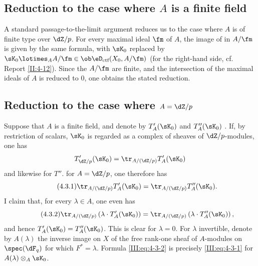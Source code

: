\subsection{Reduction to the case where \texorpdfstring{$A$}{A} is a finite field}\label{III:4-2}

A standard passage-to-the-limit argument reduces us to the case where $A$ is
of finite type over $\dZ/p$. For every maximal ideal $\fm$ of $A$, the image
of  in $A/\fm$ is given by the same formula,
with $\sK_0$ replaced by
$\sK_0\lotimes_A A/\fm\in\ob\eD_\text{ctf}(X_0,A/\fm)$ (for the right-hand
side, cf. Report \ref{II:4-12}). Since the $A/\fm$ are finite, and the
intersection of the maximal ideals of $A$ is reduced to $0$, one obtains the
stated reduction.






\subsection{Reduction to the case where \texorpdfstring{$A=\dZ/p$}{A=Z/p}}\label{III:4-3}

Suppose that $A$ is a finite field, and denote by $T_A'(\sK_0)$ and
$T_A''(\sK_0)$ . If, by restriction of
scalars, $\sK_0$ is regarded as a complex of sheaves of $\dZ/p$-modules, one
has
\[
  T_{\dZ/p}'(\sK_0) = \tr_{A/(\dZ/p)} T_A'(\sK_0)
\]
and likewise for $T''$.  for $A=\dZ/p$, one
therefore has
\begin{equation*}\tag{4.3.1}\label{III:eq:4-3-1}
  \tr_{A/(\dZ/p)} T_A'(\sK_0) = \tr_{A/(\dZ/p)} T_A''(\sK_0) \text{.}
\end{equation*}
I claim that, for every $\lambda\in A$, one even has
\begin{equation*}\tag{4.3.2}\label{III:eq:4-3-2}
  \tr_{A/(\dZ/p)}\left(\lambda\cdot T_A'(\sK_0)\right) = \tr_{A/(\dZ/p)}\left(\lambda\cdot T_A''(\sK_0)\right) \text{,}
\end{equation*}
and hence $T_A'(\sK_0) = T_A''(\sK_0)$. This is clear for $\lambda=0$. For
$\lambda$ invertible, denote by $A(\lambda)$ the inverse image on $X$ of the
free rank-one sheaf of $A$-modules on $\spec(\dF_q)$ for which
$F^*=\lambda$. Formula \eqref{III:eq:4-3-2} is precisely
\eqref{III:eq:4-3-1} for $A(\lambda)\otimes_A \sK_0$.






